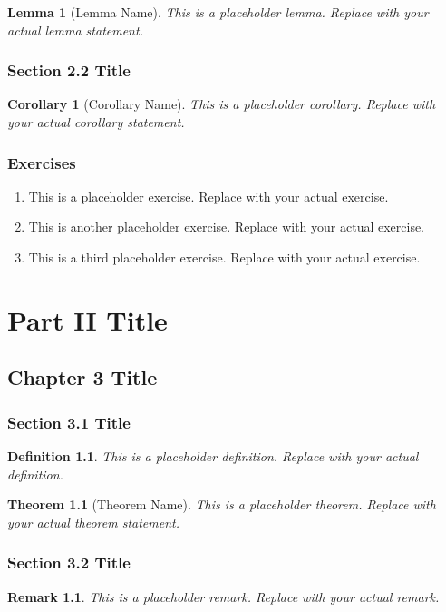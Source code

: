 \documentclass[11pt]{book}
\newtheorem{definition}{Definition}[chapter]
\newtheorem{theorem}{Theorem}[chapter]
\newtheorem{lemma}{Lemma}[chapter]
\newtheorem{corollary}{Corollary}[chapter]
\newtheorem{remark}{Remark}[chapter]
\begin{document}
\begin{lemma}[Lemma Name]
This is a placeholder lemma. Replace with your actual lemma statement.
\end{lemma}

\section{Section 2.2 Title}
\begin{corollary}[Corollary Name]
This is a placeholder corollary. Replace with your actual corollary statement.
\end{corollary}

\section{Exercises}
\begin{enumerate}
\item This is a placeholder exercise. Replace with your actual exercise.
\item This is another placeholder exercise. Replace with your actual exercise.
\item This is a third placeholder exercise. Replace with your actual exercise.
\end{enumerate}

\part{Part II Title}

\chapter{Chapter 3 Title}
\section{Section 3.1 Title}
\begin{definition}
This is a placeholder definition. Replace with your actual definition.
\end{definition}

\begin{theorem}[Theorem Name]
This is a placeholder theorem. Replace with your actual theorem statement.
\end{theorem}

\section{Section 3.2 Title}
\begin{remark}
This is a placeholder remark. Replace with your actual remark.
\end{remark}
\end{document}
